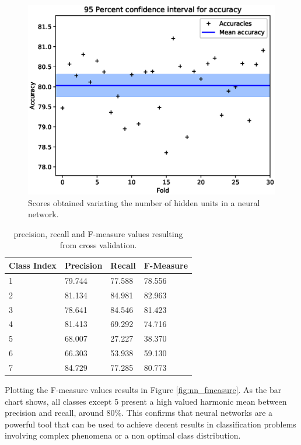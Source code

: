 \documentclass[a4paper, 10pt]{article}
\begin{document}
\begin{figure}[H]
 \centering
 \includegraphics[width=0.8\linewidth]{pictures/nn_accuracy_interval.eps}
 \caption{Scores obtained variating the number of hidden units in a neural network.}
 \label{fig:nn_accuracy_interval}
\end{figure}

\begin{table}[H]
\centering
\begin{tabular}{|l|l|l|l|}
\hline
\textbf{Class Index} & \textbf{Precision} & \textbf{Recall} & \textbf{F-Measure}\\\hline
1 & 79.744 & 77.588& 78.556\\\hline
2 & 81.134 & 84.981& 82.963\\\hline
3 & 78.641 & 84.546& 81.423\\\hline
4 & 81.413 & 69.292& 74.716\\\hline
5 & 68.007 & 27.227& 38.370\\\hline
6 & 66.303 & 53.938& 59.130\\\hline
7 & 84.729 & 77.285& 80.773\\\hline
\end{tabular}
\caption{precision, recall and F-measure values resulting from cross validation.}
\label{tab:nn_cross_pr}
\end{table}

Plotting the F-measure values results in Figure \ref{fig:nn_fmeasure}. As the bar chart shows, all classes except 5 present a high valued harmonic mean between precision and recall, around $80\%$. This confirms that neural networks are a powerful tool that can be used to achieve decent results in classification problems involving complex phenomena or a non optimal class distribution.
\end{document}
